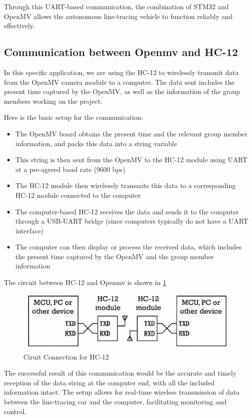 \documentclass[12pt, a4paper, oneside]{report}
\begin{document}
Through this UART-based communication, the combination of STM32 and OpenMV allows the autonomous line-tracing vehicle to function reliably and effectively.

\subsection{Communication between Openmv and HC-12}
In this specific application, we are using the HC-12 to wirelessly transmit data from the OpenMV camera module to a computer. The data sent includes the present time captured by the OpenMV, as well as the information of the group members working on the project.

Here is the basic setup for the communication:
\begin{itemize}
    \item The OpenMV board obtains the present time and the relevant group member information, and packs this data into a string variable
    \item This string is then sent from the OpenMV to the HC-12 module using UART at a pre-agreed baud rate (9600 bps)
    \item The HC-12 module then wirelessly transmits this data to a corresponding HC-12 module connected to the computer
    \item The computer-based HC-12 receives the data and sends it to the computer through a USB-UART bridge (since computers typically do not have a UART interface)
    \item The computer can then display or process the received data, which includes the present time captured by the OpenMV and the group member information
\end{itemize}

The circuit between HC-12 and Openmv is shown in \ref{hc12-cir}

\begin{figure}[!h]
    \centering
    \includegraphics{pic/HC12/hc12-3.png}
    \caption{Ciruit Connection for HC-12}
    \label{hc12-cir}
\end{figure}

The successful result of this communication would be the accurate and timely reception of the data string at the computer end, with all the included information intact. The setup allows for real-time wireless transmission of data between the line-tracing car and the computer, facilitating monitoring and control.
\end{document}
